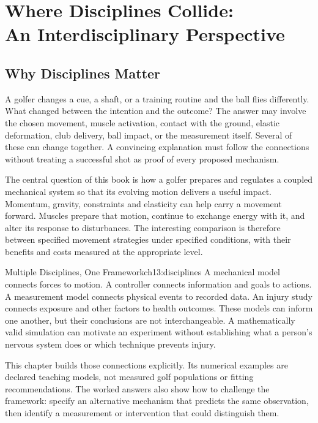 \chapter[Where Disciplines Collide: An Interdisciplinary Perspective]{Where Disciplines Collide:\\An Interdisciplinary Perspective}
\label{ch:interdisciplinary}

\section{Why Disciplines Matter}

A golfer changes a cue, a shaft, or a training routine and the ball flies differently. What changed between the intention and the outcome? The answer may involve the chosen movement, muscle activation, contact with the ground, elastic deformation, club delivery, ball impact, or the measurement itself. Several of these can change together. A convincing explanation must follow the connections without treating a successful shot as proof of every proposed mechanism.

The central question of this book is how a golfer prepares and regulates a coupled mechanical system so that its evolving motion delivers a useful impact. Momentum, gravity, constraints and elasticity can help carry a movement forward. Muscles prepare that motion, continue to exchange energy with it, and alter its response to disturbances. The interesting comparison is therefore between specified movement strategies under specified conditions, with their benefits and costs measured at the appropriate level.

\begin{laymansbox}{Multiple Disciplines, One Framework}{ch13:disciplines}
A mechanical model connects forces to motion. A controller connects information and goals to actions. A measurement model connects physical events to recorded data. An injury study connects exposure and other factors to health outcomes. These models can inform one another, but their conclusions are not interchangeable. A mathematically valid simulation can motivate an experiment without establishing what a person's nervous system does or which technique prevents injury.
\end{laymansbox}

This chapter builds those connections explicitly. Its numerical examples are declared teaching models, not measured golf populations or fitting recommendations. The worked answers also show how to challenge the framework: specify an alternative mechanism that predicts the same observation, then identify a measurement or intervention that could distinguish them.

